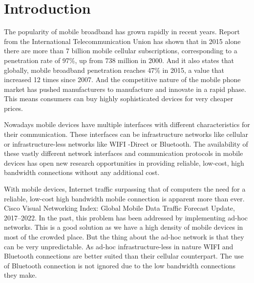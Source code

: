 \chapter[Introduction]{Introduction}
\vspace{12pt}

\vspace{12pt}

  
The popularity of mobile broadband has grown rapidly in recent years. Report from the International Telecommunication Union \cite{no_of_mobile_devices_ICTFacts} has shown that in 2015 alone there are more
than 7 billion mobile cellular subscriptions, corresponding to a penetration rate of 97\%,
up from 738 million in 2000. And it also states that globally, mobile broadband penetration
reaches 47\% in 2015, a value that increased 12 times since 2007. And the competitive nature of the mobile phone market has pushed manufacturers to manufacture and innovate in a rapid phase. This means consumers can buy highly sophisticated devices for very cheaper prices.

\vspace{12pt}

Nowadays mobile devices have multiple interfaces with different characteristics for their communication. These interfaces can be infrastructure networks like cellular or infrastructure-less networks like   WIFI  -Direct or Bluetooth. The availability of these vastly different network interfaces and communication protocols in mobile devices has open new research opportunities in providing reliable, low-cost, high bandwidth connections without any additional cost.

\vspace{12pt}

With mobile devices, Internet traffic surpassing that of computers the need for a reliable, low-cost high bandwidth mobile connection is apparent more than ever. Cisco Visual Networking Index: Global Mobile Data Traffic Forecast Update, 2017–2022\cite{mobile_web_penetration}. In the past, this problem has been addressed by implementing ad-hoc networks. This is a good solution as we have a high density of mobile devices in most of the crowded place. But the thing about the ad-hoc network is that they can be very unpredictable. As ad-hoc infrastructure-less in nature   WIFI   and Bluetooth connections are better suited than their cellular counterpart. The use of Bluetooth connection is not ignored due to the low bandwidth connections they make.

\vspace{12pt}

